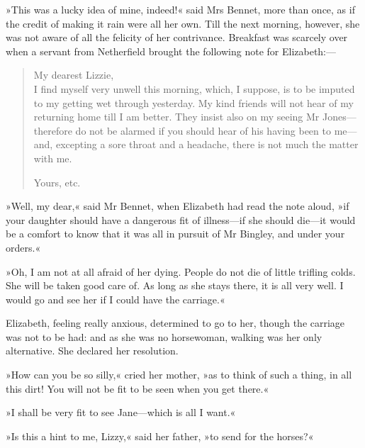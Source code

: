 »This was a lucky idea of mine, indeed!« said Mrs Bennet, more than once, as if the credit of making it rain were all her own. Till the next morning, however, she was not aware of all the felicity of her contrivance. Breakfast was scarcely over when a servant from Netherfield brought the following note for Elizabeth:—


\begin{samepage}
\begin{quotation}
\noindent My dearest Lizzie,\\

\indent I find myself very unwell this morning, which, I suppose, is to be imputed to my getting wet through yesterday. My kind friends will not hear of my returning home till I am better. They insist also on my seeing Mr Jones—therefore do not be alarmed if you should hear of his having been to me—and, excepting a sore throat and a headache, there is not much the matter with me.\\

\begin{flushright}
\noindent Yours, etc.
\end{flushright}
\end{quotation}
\end{samepage}



»Well, my dear,« said Mr Bennet, when Elizabeth had read the note aloud, »if your daughter should have a dangerous fit of illness—if she should die—it would be a comfort to know that it was all in pursuit of Mr Bingley, and under your orders.«

»Oh, I am not at all afraid of her dying. People do not die of little trifling colds. She will be taken good care of. As long as she stays there, it is all very well. I would go and see her if I could have the carriage.«

Elizabeth, feeling really anxious, determined to go to her, though the carriage was not to be had: and as she was no horsewoman, walking was her only alternative. She declared her resolution.

»How can you be so silly,« cried her mother, »as to think of such a thing, in all this dirt! You will not be fit to be seen when you get there.«

»I shall be very fit to see Jane—which is all I want.«

»Is this a hint to me, Lizzy,« said her father, »to send for the horses?«

